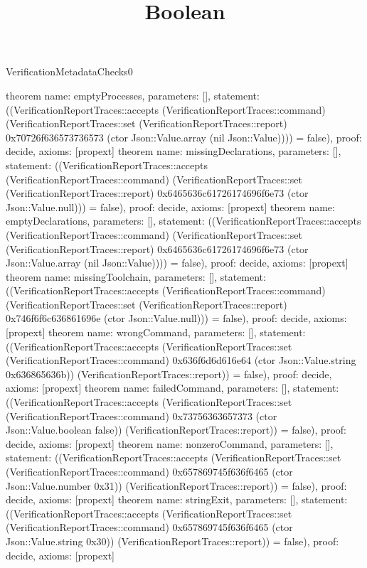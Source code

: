 \begin{lexlean}{VerificationMetadataChecks0}
\title{Boolean}
\begin{semanticmodule}
theorem{
  name: emptyProcesses,
  parameters: [],
  statement: ((VerificationReportTraces::accepts (VerificationReportTraces::command) (VerificationReportTraces::set (VerificationReportTraces::report) 0x70726f636573736573 (ctor Json::Value.array (nil Json::Value)))) = false),
  proof: decide{},
  axioms: [propext]
}
theorem{
  name: missingDeclarations,
  parameters: [],
  statement: ((VerificationReportTraces::accepts (VerificationReportTraces::command) (VerificationReportTraces::set (VerificationReportTraces::report) 0x6465636c61726174696f6e73 (ctor Json::Value.null))) = false),
  proof: decide{},
  axioms: [propext]
}
theorem{
  name: emptyDeclarations,
  parameters: [],
  statement: ((VerificationReportTraces::accepts (VerificationReportTraces::command) (VerificationReportTraces::set (VerificationReportTraces::report) 0x6465636c61726174696f6e73 (ctor Json::Value.array (nil Json::Value)))) = false),
  proof: decide{},
  axioms: [propext]
}
theorem{
  name: missingToolchain,
  parameters: [],
  statement: ((VerificationReportTraces::accepts (VerificationReportTraces::command) (VerificationReportTraces::set (VerificationReportTraces::report) 0x746f6f6c636861696e (ctor Json::Value.null))) = false),
  proof: decide{},
  axioms: [propext]
}
theorem{
  name: wrongCommand,
  parameters: [],
  statement: ((VerificationReportTraces::accepts (VerificationReportTraces::set (VerificationReportTraces::command) 0x636f6d6d616e64 (ctor Json::Value.string 0x636865636b)) (VerificationReportTraces::report)) = false),
  proof: decide{},
  axioms: [propext]
}
theorem{
  name: failedCommand,
  parameters: [],
  statement: ((VerificationReportTraces::accepts (VerificationReportTraces::set (VerificationReportTraces::command) 0x73756363657373 (ctor Json::Value.boolean false)) (VerificationReportTraces::report)) = false),
  proof: decide{},
  axioms: [propext]
}
theorem{
  name: nonzeroCommand,
  parameters: [],
  statement: ((VerificationReportTraces::accepts (VerificationReportTraces::set (VerificationReportTraces::command) 0x657869745f636f6465 (ctor Json::Value.number 0x31)) (VerificationReportTraces::report)) = false),
  proof: decide{},
  axioms: [propext]
}
theorem{
  name: stringExit,
  parameters: [],
  statement: ((VerificationReportTraces::accepts (VerificationReportTraces::set (VerificationReportTraces::command) 0x657869745f636f6465 (ctor Json::Value.string 0x30)) (VerificationReportTraces::report)) = false),
  proof: decide{},
  axioms: [propext]
}
\end{semanticmodule}
\end{lexlean}
